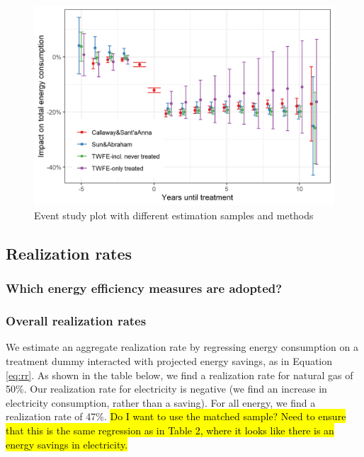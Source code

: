 \documentclass{article}
\newcommand{\hlc}[2][yellow]{ {\sethlcolor{#1} \hl{#2}} }
\begin{document}
\begin{figure}
	\includegraphics{../output_figures_tables/event_study_plot}
	\caption{Event study plot with different estimation samples and methods}\label{fig_esplot}
\end{figure}


\subsection{Realization rates}

\subsubsection{Which energy efficiency measures are adopted?}



\subsubsection{Overall realization rates}
We estimate an aggregate realization rate by regressing energy consumption on a treatment dummy interacted with projected energy savings, as in Equation \ref{eq:rr}. As shown in the table below, we find a realization rate for natural gas of 50\%. Our realization rate for electricity is negative (we find an increase in electricity consumption, rather than a saving). For all energy, we find a realization rate of 47\%. \hlc{Do I want to use the matched sample? Need to ensure that this is the same regression as in Table 2, where it looks like there is an energy savings in electricity.}


\end{document}

